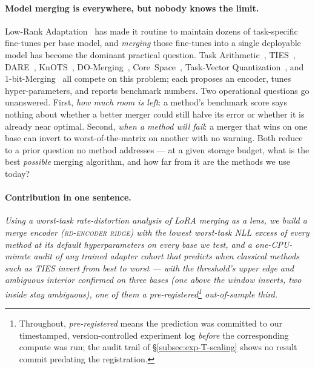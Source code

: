 \paragraph{Model merging is everywhere, but nobody knows the limit.}
Low-Rank Adaptation~\cite{hu2022lora} has made it routine to maintain
dozens of task-specific fine-tunes per base model, and \emph{merging}
those fine-tunes into a single deployable model has become the
dominant practical question. Task Arithmetic~\cite{ilharco2023task},
TIES~\cite{yadav2023ties}, DARE~\cite{yu2024dare},
KnOTS~\cite{stoica2025knots}, DO-Merging~\cite{domerging2025},
Core~Space~\cite{panariello2025core}, Task-Vector
Quantization~\cite{kim2025tvq}, and 1-bit-Merging~\cite{bit1merging2025}
all compete on this problem; each proposes an encoder, tunes
hyper-parameters, and reports benchmark numbers. Two operational
questions go unanswered. First, \emph{how much room is left}: a
method's benchmark score says nothing about whether a better merger
could still halve its error or whether it is already near optimal.
Second, \emph{when a method will fail}: a merger that wins on one base
can invert to worst-of-the-matrix on another with no warning. Both
reduce to a prior question no method addresses --- at a given storage
budget, what is the best \emph{possible} merging algorithm, and how far
from it are the methods we use today?

\paragraph{Contribution in one sentence.} \emph{Using a worst-task
rate-distortion analysis of LoRA merging as a lens, we build a merge
encoder (\textsc{rd-encoder ridge}) with the lowest worst-task NLL
excess of every method at its default hyperparameters on every base we
test, and a one-CPU-minute audit of any
trained adapter cohort that predicts when classical methods such as
TIES invert from best to worst --- with the threshold's upper edge and
ambiguous interior confirmed on three bases (one above the window
inverts, two inside stay ambiguous), one of them a pre-registered\footnote{Throughout,
\emph{pre-registered} means the prediction was committed to our
timestamped, version-controlled experiment log \emph{before} the
corresponding compute was run; the audit trail of
\S\ref{subsec:exp-T-scaling} shows no result commit predating the
registration.} out-of-sample third.}

